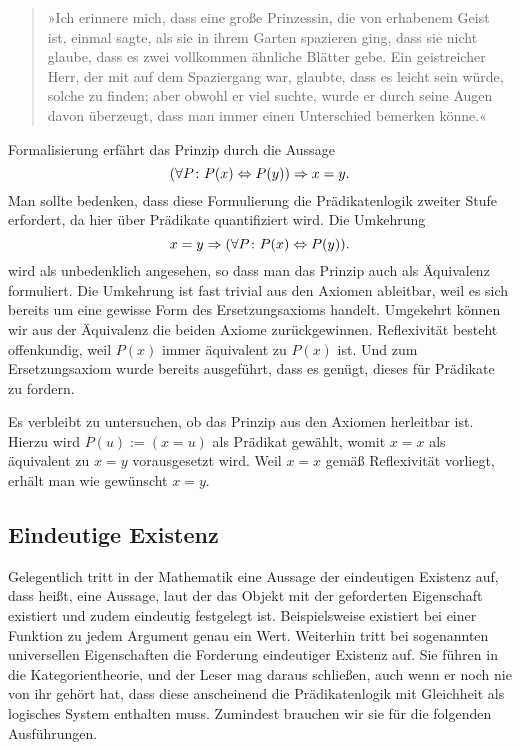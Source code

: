 \begin{quote}
»Ich erinnere mich, dass eine große Prinzessin, die von erhabenem Geist
ist, einmal sagte, als sie in ihrem Garten spazieren ging, dass sie
nicht glaube, dass es zwei vollkommen ähnliche Blätter gebe. Ein
geistreicher Herr, der mit auf dem Spaziergang war, glaubte, dass es
leicht sein würde, solche zu finden; aber obwohl er viel suchte, wurde
er durch seine Augen davon überzeugt, dass man immer einen Unterschied
bemerken könne.«
\end{quote}

\noindent
Formalisierung erfährt das Prinzip durch die Aussage
\[(\forall P\colon P(x)\Leftrightarrow P(y))\Rightarrow x=y.\]
Man sollte bedenken, dass diese Formulierung die Prädikatenlogik
zweiter Stufe erfordert, da hier über Prädikate quantifiziert wird.
Die Umkehrung
\[x=y\Rightarrow (\forall P\colon P(x)\Leftrightarrow P(y)).\]
wird als unbedenklich angesehen, so dass man das Prinzip auch als
Äquivalenz formuliert. Die Umkehrung ist fast trivial aus den
Axiomen ableitbar, weil es sich bereits um eine gewisse Form des
Ersetzungsaxioms handelt. Umgekehrt können wir aus der Äquivalenz die
beiden Axiome zurückgewinnen. Reflexivität besteht offenkundig, weil
$P(x)$ immer äquivalent zu $P(x)$ ist. Und zum Ersetzungsaxiom wurde
bereits ausgeführt, dass es genügt, dieses für Prädikate zu fordern.

Es verbleibt zu untersuchen, ob das Prinzip aus den Axiomen
herleitbar ist. Hierzu wird $P(u):=(x=u)$ als Prädikat gewählt, womit
$x=x$ als äquivalent zu $x=y$ vorausgesetzt wird. Weil $x=x$ gemäß
Reflexivität vorliegt, erhält man wie gewünscht $x=y$.

\newpage
\subsection{Eindeutige Existenz}

Gelegentlich tritt in der Mathematik eine Aussage der eindeutigen
Existenz auf, dass heißt, eine Aussage, laut der das Objekt mit der
geforderten Eigenschaft existiert und zudem eindeutig festgelegt ist.
Beispielsweise existiert bei einer Funktion zu jedem Argument genau ein
Wert. Weiterhin tritt bei sogenannten universellen Eigenschaften die
Forderung eindeutiger Existenz auf. Sie führen in die Kategorientheorie,
und der Leser mag daraus schließen, auch wenn er noch nie von ihr gehört
hat, dass diese anscheinend die Prädikatenlogik mit Gleichheit als
logisches System enthalten muss. Zumindest brauchen wir sie für die
folgenden Ausführungen.

